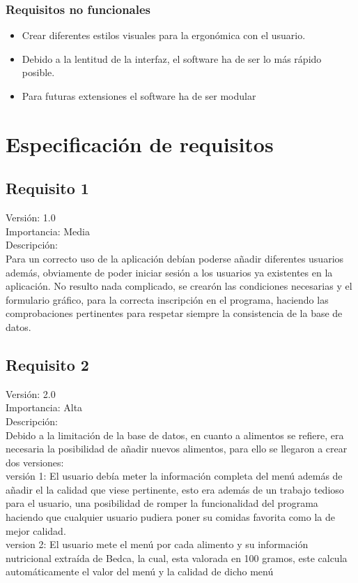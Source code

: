 \subsubsection{Requisitos no funcionales}
\begin{itemize}
\item Crear diferentes estilos visuales para la ergonómica con el usuario.
\item Debido a la lentitud de la interfaz, el software ha de ser lo más rápido posible.
\item Para futuras extensiones el software ha de ser modular
\end{itemize}
\section{Especificación de requisitos}
\subsection{Requisito 1}
Versión: 1.0\\
Importancia: Media\\
Descripción:\\
Para un correcto uso de la aplicación debían poderse añadir diferentes usuarios además, obviamente de poder iniciar sesión a los usuarios ya existentes en la aplicación. No resulto nada complicado, se crearón las condiciones necesarias y el formulario gráfico, para la correcta inscripción en el programa, haciendo las comprobaciones pertinentes para respetar siempre la consistencia de la base de datos.

\subsection{Requisito 2}
Versión: 2.0\\
Importancia: Alta\\
Descripción:\\
Debido a la limitación de la base de datos, en cuanto a alimentos se refiere, era necesaria la posibilidad de añadir nuevos alimentos, para ello se llegaron a crear dos versiones:\\
versión 1: El usuario debía meter la información completa del menú además de añadir el la calidad que viese pertinente, esto era además de un trabajo tedioso para el usuario, una posibilidad de romper la funcionalidad del programa haciendo que cualquier usuario pudiera poner su comidas favorita como la de mejor calidad.\\
version 2: El usuario mete el menú por cada alimento y su información nutricional extraída de Bedca, la cual, esta valorada en 100 gramos, este calcula automáticamente el valor del menú y la calidad de dicho menú
